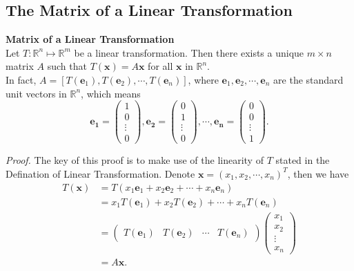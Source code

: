 \documentclass[10pt, a4paper]{article}
\begin{document}
\subsection{The Matrix of a Linear Transformation}
\begin{proposition}
    \textbf{Matrix of a Linear Transformation}\\
    Let $T: \mathbb{R}^n \mapsto \mathbb{R}^m$ be a linear transformation. Then there exists a unique $m\times n$ matrix $A$ such that $T(\mathbf{x})=A\mathbf{x}$ for all $\mathbf{x}$ in $\mathbb{R}^n$.\\
    In fact, $A=[T(\mathbf{e}_1), T(\mathbf{e}_2), \cdots, T(\mathbf{e}_n)]$, where $\mathbf{e}_1, \mathbf{e}_2, \cdots, \mathbf{e}_n$ are the standard unit vectors in $\mathbb{R}^n$, which means
    \[
    \mathbf{e_1} = \begin{pmatrix} 1 \\ 0 \\ \vdots \\ 0 \end{pmatrix}, \mathbf{e_2} = \begin{pmatrix} 0 \\ 1 \\ \vdots \\ 0 \end{pmatrix}, \cdots, \mathbf{e_n} = \begin{pmatrix} 0 \\ 0 \\ \vdots \\ 1 \end{pmatrix}.
    \]
\end{proposition}
\indent \textit{Proof.} The key of this proof is to make use of the linearity of $T$ stated in the Defination of Linear Transformation. 
Denote $\mathbf{x} = (x_1, x_2, \cdots, x_n)^T$, then we have
\begin{align*}
    T(\mathbf{x}) &= T(x_1\mathbf{e}_1+x_2\mathbf{e}_2+\cdots+x_n\mathbf{e}_n) \\
    &= x_1T(\mathbf{e}_1)+x_2T(\mathbf{e}_2)+\cdots+x_nT(\mathbf{e}_n) \\
    &= \begin{pmatrix} T(\mathbf{e}_1) & T(\mathbf{e}_2) & \cdots & T(\mathbf{e}_n) \end{pmatrix} \begin{pmatrix} x_1 \\ x_2 \\ \vdots \\ x_n \end{pmatrix} \\
    &= A\mathbf{x}.
\end{align*}    
\end{document}
